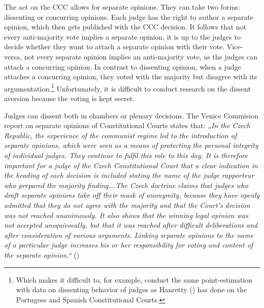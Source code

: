 \documentclass[
  11pt,
]{article}
\begin{document}
The act on the CCC allows for separate opinions. They can take two forms: dissenting or concurring opinions. Each judge has the right to author a separate opinion, which then gets published with the CCC decision. It follows that not every anti-majority vote implies a separate opinion, it is up to the judges to decide whether they want to attach a separate opinion with their vote. Vice-versa, not every separate opinion implies an anti-majority vote, as the judges can attach a concurring opinion. In contrast to dissenting opinion, when a judge attaches a concurring opinion, they voted with the majority but disagree with its argumentation.\footnote{Which makes it difficult to, for example, conduct the same point-estimation with data on dissenting behavior of judges as Hanretty () has done on the Portugese and Spanish Constitutional Courts.} Unfortunately, it is difficult to conduct research on the dissent aversion because the voting is kept secret.

Judges can dissent both in chambers or plenary decisions. The Venice Commision report on separate opinions of Constitutional Courts states that: \emph{„In the Czech Republic, the experience of the communist regime led to the introduction of separate opinions, which were seen as a means of protecting the personal integrity of individual judges. They continue to fulfil this role to this day. It is therefore important for a judge of the Czech Constitutional Court that a clear indication in the heading of each decision is included stating the name of the judge rapporteur who prepared the majority finding\ldots.The Czech doctrine claims that judges who draft separate opinions take off their mask of anonymity, because they have openly admitted that they do not agree with the majority and that the Court's decision was not reached unanimously. It also shows that the winning legal opinion was not accepted unequivocally, but that it was reached after difficult deliberations and after consideration of various arguments. Linking separate opinions to the name of a particular judge increases his or her responsibility for voting and content of the separate opinion.``} ()
\end{document}
